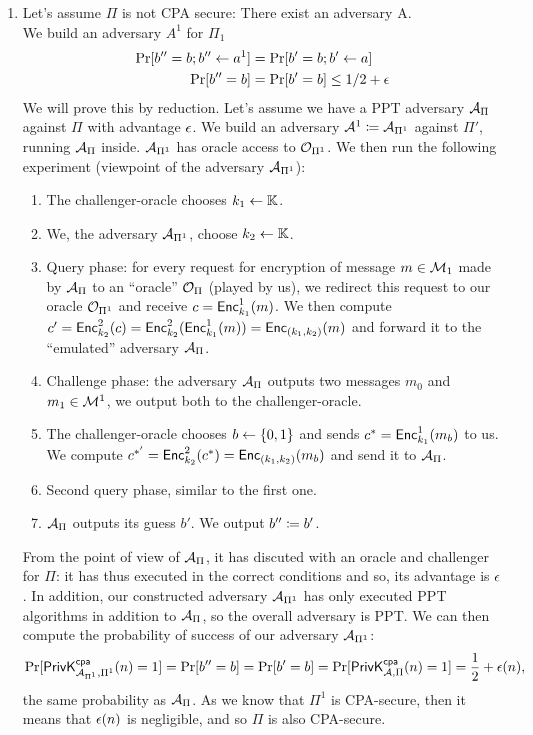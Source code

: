 \begin{solution}
\begin{enumerate}
	\item Let's assume $\Pi$ is not CPA secure: There exist an adversary A.\\
	We build an adversary $A^1$ for $\Pi_1$
	\begin{align*}
		\Pr[b''=b;b''\leftarrow a^1] &= \Pr[b'=b;b'\leftarrow a]\\
		\Pr[b''=b] &= \Pr[b'=b] \le 1/2+\negl
	\end{align*}
	We will prove this by reduction.
	Let's assume we have a PPT adversary $\A_\Pi$ against $\Pi$ with advantage $\negl$.
	We build an adversary $\A^1 \define \A_{\Pi^1}$ against $\Pi'$, running $\A_\Pi$ inside.
	$\A_{\Pi^1}$ has oracle access to $\O_{\Pi^1}$.
	We then run the following experiment (viewpoint of the adversary $\A_{\Pi^1}$):
	\begin{enumerate}[label=(\arabic*)]
		\item The challenger-oracle chooses $k_1 \pick \K$.
		\item We, the adversary $\A_{\Pi^1}$, choose $k_2 \pick \K$.
		\item Query phase: for every request for encryption of message $m\in\M_1$ made by $\A_\Pi$ to an ``oracle'' $\O_\Pi$ (played by us), we redirect this request to our oracle $\O_{\Pi^1}$ and receive $c=\Enc^1_{k_1}(m)$. We then compute $c'=\Enc^2_{k_2}(c)=\Enc^2_{k_2}(\Enc^1_{k_1}(m))=\Enc_{(k_1,k_2)}(m)$ and forward it to the ``emulated'' adversary $\A_\Pi$.
		\item Challenge phase: the adversary $\A_\Pi$ outputs two messages $m_0$ and $m_1 \in \M^1$, we output both to the challenger-oracle.
		\item The challenger-oracle chooses $b \pick \{0,1\}$ and sends $c^*=\Enc^1_{k_1}(m_b)$ to us. We compute $c^{*'}=\Enc^2_{k_2}(c^*)=\Enc_{(k_1,k_2)}(m_b)$ and send it to $\A_\Pi$.
		\item Second query phase, similar to the first one.
		\item $\A_\Pi$ outputs its guess $b'$. We output $b'' \define b'$.
	\end{enumerate}
	From the point of view of $\A_\Pi$, it has discuted with an oracle and challenger for $\Pi$: it has thus executed in the correct conditions and so, its advantage is $\negl$. In addition, our constructed adversary $\A_{\Pi^1}$ has only executed PPT algorithms in addition to $\A_\Pi$, so the overall adversary is PPT.
	We can then compute the probability of success of our adversary $\A_{\Pi^1}$:
	\[ \Pr[\PrivKcpa[\A_{\Pi^1}, \Pi^1](n)=1] = \Pr[b''=b] = \Pr[b'=b] = \Pr[\PrivKcpa(n)=1] = \frac12 + \negl(n), \]
	the same probability as $\A_\Pi$. As we know that $\Pi^1$ is CPA-secure, then it means that $\negl(n)$ is negligible, and so $\Pi$ is also CPA-secure.


\end{enumerate}
\end{solution}
